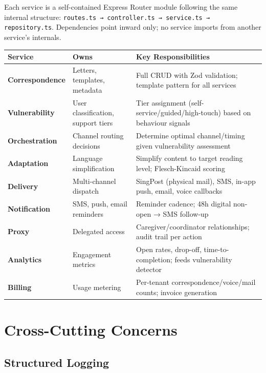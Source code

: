 \documentclass[12pt,a4paper]{article}
\begin{document}
Each service is a self-contained Express Router module following the same internal
structure: \texttt{routes.ts → controller.ts → service.ts → repository.ts}. Dependencies
point inward only; no service imports from another service's internals.

\begin{longtable}{@{}lp{4cm}p{6cm}@{}}
\toprule
\textbf{Service} & \textbf{Owns} & \textbf{Key Responsibilities} \\
\midrule
\endhead
\textbf{Correspondence} & Letters, templates, metadata & Full CRUD with Zod validation; template pattern for all services \\
\textbf{Vulnerability}  & User classification, support tiers & Tier assignment (self-service/guided/high-touch) based on behaviour signals \\
\textbf{Orchestration}  & Channel routing decisions & Determine optimal channel/timing given vulnerability assessment \\
\textbf{Adaptation}     & Language simplification    & Simplify content to target reading level; Flesch-Kincaid scoring \\
\textbf{Delivery}       & Multi-channel dispatch     & SingPost (physical mail), SMS, in-app push, email, voice callbacks \\
\textbf{Notification}   & SMS, push, email reminders & Reminder cadence; 48h digital non-open → SMS follow-up \\
\textbf{Proxy}          & Delegated access           & Caregiver/coordinator relationships; audit trail per action \\
\textbf{Analytics}      & Engagement metrics         & Open rates, drop-off, time-to-completion; feeds vulnerability detector \\
\textbf{Billing}        & Usage metering             & Per-tenant correspondence/voice/mail counts; invoice generation \\
\bottomrule
\end{longtable}

\section{Cross-Cutting Concerns}
\label{sec:crosscutting}

\subsection{Structured Logging}
\end{document}
